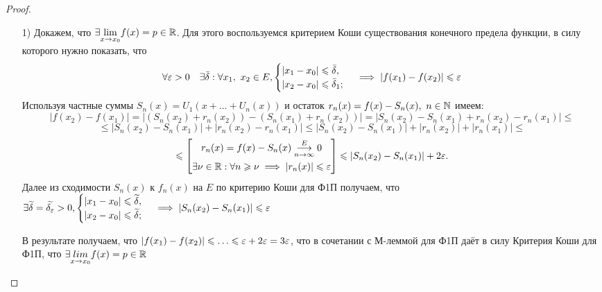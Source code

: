\documentclass[../../main.tex]{subfiles}
\begin{document}
\begin{proof}
	\;
	\begin{itemize}
		\item[1)] Докажем, что $\exists \underset{x \to x_0}{\lim} f(x) = 
	p \in \mathbb{R}$. Для этого воспользуемся критерием Коши существования 
	конечного предела функции, в силу которого нужно показать, что
	\begin{equation}
	\label{lec2:17}
	\forall \varepsilon > 0 \quad \exists \bar\delta :
	\forall x_1,\ x_2 \in E, 
	\begin{cases}
	|x_1 - x_0| \leqslant \bar\delta, \\
	|x_2 - x_0| \leqslant \bar\delta_1;
	\end{cases} \implies
	|f(x_1) - f(x_2)| \leqslant \varepsilon
	\end{equation}
	Используя частные суммы $S_n(x) = U_1(x + \ldots + U_n(x))$ и 
	остаток $r_n(x) = f(x) - S_n(x),\ n \in \mathbb{N}$ имеем:
	\[
	|f(x_2) - f(x_1)| = |(S_n(x_2) + r_n(x_2)) - (S_n(x_1) + r_n(x_2))| =
	|S_n(x_2) - S_n(x_1) + r_n(x_2) - r_n(x_1)| \leq 
	\]
	\[
	\leq |S_n(x_2) - S_n(x_1)| + |r_n(x_2) - r_n(x_1)| \leq 
	|S_n(x_2) - S_n(x_1)| + |r_n(x_2)| + |r_n(x_1)| \leq
	\]
	\[
	\leqslant 
	\left[
	\begin{gathered}
	r_n(x) = f(x) - S_n(x) \overset{E}
	{\underset{n \to \infty}\longrightarrow} 0 \\
	\exists \nu \in \mathbb{R} : \forall n \geqslant \nu \implies
	|r_n(x)| \leqslant \varepsilon
	\end{gathered}
	\right] \leqslant |S_n(x_2) - S_n(x_1)| + 2\varepsilon.
	\]
	Далее из сходимости $S_n(x)$ к $f_n(x)$ на $E$ по критерию Коши для Ф1П
	получаем, что $\exists \widetilde{\delta} = \widetilde{\delta_\varepsilon} > 0,
	\begin{cases} 
	|x_1 - x_0| \leqslant \widetilde{\delta}, \\
	|x_2 - x_0| \leqslant \widetilde{\delta};
	\end{cases} \implies
	|S_n(x_2) - S_n(x_1)| \leqslant \varepsilon$ 
	
	В результате получаем, что $|f(x_1) - f(x_2)| \leqslant \ldots \leqslant 
	\varepsilon + 2\varepsilon = 3\varepsilon$, что в сочетании с М-леммой для Ф1П даёт
	в силу Критерия Коши для Ф1П, что $\exists \underset{x \to x_0}{lim}
	f(x) = p \in \mathbb{R}$ 
	\end{itemize}
\end{proof}







	
\end{document}
